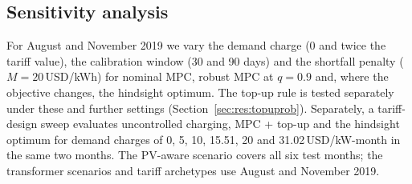\subsection{Sensitivity analysis}\label{sec:sens}
For August and November 2019 we vary the demand charge (0 and twice the tariff value), the calibration window (30 and 90 days) and the shortfall penalty ($M=20$\,USD/kWh) for nominal MPC, robust MPC at $q=0.9$ and, where the objective changes, the hindsight optimum. The top-up rule is tested separately under these and further settings (Section~\ref{sec:res:topuprob}). Separately, a tariff-design sweep evaluates uncontrolled charging, MPC + top-up and the hindsight optimum for demand charges of 0, 5, 10, 15.51, 20 and 31.02\,USD/kW-month in the same two months. The PV-aware scenario covers all six test months; the transformer scenarios and tariff archetypes use August and November 2019.
